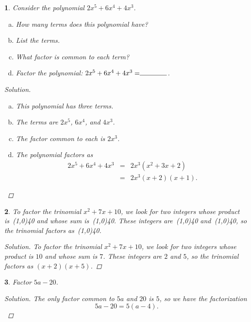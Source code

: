 \documentclass[12pt]{amsart}
\newtheorem{thm}{}
\begin{document}
\setcounter{thm}{0}
\begin{thm}
  Consider the polynomial $2x^5 + 6x^4 + 4x^3$.
  \begin{enumerate}[(a)]
  \item
    How many terms does this polynomial have?
  \item
    List the terms.
  \item
    What factor is common to each term?
  \item
    Factor the polynomial: $2x^5 + 6x^4 + 4x^3 = \line(1,0){40}$.
  \end{enumerate}
  
  \begin{proof}[Solution]
    \begin{enumerate}[(a)]
      \item
        This polynomial has three terms.
      \item
        The terms are $2x^5$, $6x^4$, and $4x^3$.
      \item
        The factor common to each is $2x^3$.
      \item
        The polynomial factors as 
        \begin{eqnarray*}
          2x^5 + 6x^4 + 4x^3 &=& 2x^3(x^2 + 3x + 2)\\
          &=& 2x^3(x + 2)(x + 1).
        \end{eqnarray*}
    \end{enumerate}
  \end{proof}
\end{thm}

\begin{thm}
  To factor the trinomial $x^2 + 7x + 10$, we look for two integers whose product is\ \line(1,0){40} and whose sum is\ \line(1,0){40}.
  These integers are\ \line(1,0){40} and\ \line(1,0){40}, so the trinomial factors as\ \line(1,0){40}.
  
  \begin{proof}[Solution]
    To factor the trinomial $x^2 + 7x + 10$, we look for two integers whose product is $10$ and whose sum is $7$.
    These integers are $2$ and $5$, so the trinomial factors as $(x + 2)(x + 5)$.
  \end{proof}
\end{thm}

\setcounter{thm}{4}
\begin{thm}
  Factor $5a - 20$.
  
  \begin{proof}[Solution]
    The only factor common to $5a$ and $20$ is $5$, so we have the factorization
    $$5a - 20 = 5(a - 4).$$
  \end{proof}
\end{thm}
\end{document}
